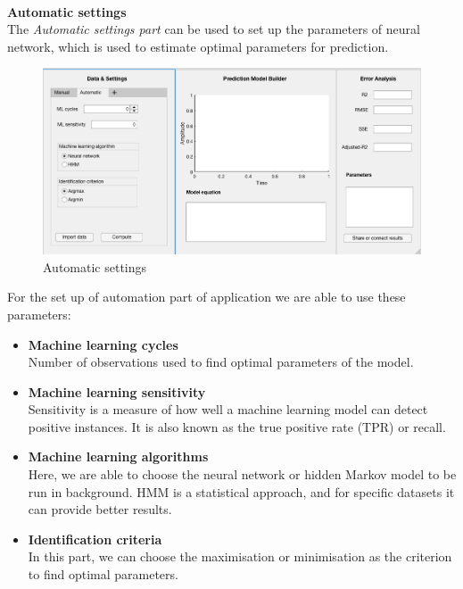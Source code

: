         \noindent
        \\
        \textbf{Automatic settings}\\
        The \emph{Automatic settings part} can be used to set up the parameters of neural network,
        which is used to estimate optimal parameters for prediction. 
       \begin{figure}[h!]
        \centering
            \includegraphics[width=\textwidth]{figures/auto.png}
            \caption{Automatic settings}
            \label{fig:automatic}
    \end{figure}
        
                For the set up of automation part of application we are able to use these parameters:
        \begin{itemize}
            \item \textbf{Machine learning cycles}\\
            Number of observations used to find optimal parameters of the model.
            \item \textbf{Machine learning sensitivity}\\
            Sensitivity is a measure of how well a machine learning model can
            detect positive instances. It is also known as the true positive rate
            (TPR) or recall.
            \item \textbf{Machine learning algorithms}\\
            Here, we are able to choose the neural network or hidden Markov model
            to be run in background. HMM is a statistical approach, and for specific datasets it can provide
            better results.
            \item \textbf{Identification criteria}\\
            In this part, we can choose the maximisation or minimisation as the criterion
            to find optimal parameters.
        \end{itemize}
   
